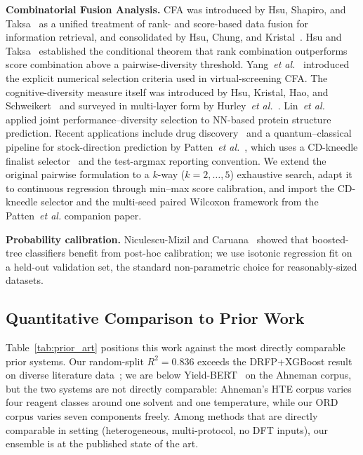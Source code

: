 \documentclass[conference]{IEEEtran}
\begin{document}
\noindent\textbf{Combinatorial Fusion Analysis.}
CFA was introduced by Hsu, Shapiro, and
Taksa~\cite{Hsu2002DIMACS} as a unified treatment of rank- and score-based
data fusion for information retrieval, and consolidated by Hsu, Chung, and
Kristal~\cite{Hsu2008}. Hsu and Taksa~\cite{Hsu2005Fusion} established
the conditional theorem that rank combination outperforms score combination
above a pairwise-diversity threshold. Yang~\textit{et
al.}~\cite{Yang2005Consensus} introduced the explicit numerical selection
criteria used in virtual-screening CFA. The cognitive-diversity measure
itself was introduced by Hsu, Kristal, Hao, and
Schweikert~\cite{Hsu2019CD} and surveyed in multi-layer form by
Hurley~\textit{et al.}~\cite{Hurley2021}. Lin~\textit{et al.}~\cite{Lin2007}
applied joint performance--diversity selection to NN-based protein
structure prediction. Recent applications include drug
discovery~\cite{Jiang2023ADMET} and a quantum--classical pipeline for
stock-direction prediction by Patten~\textit{et
al.}~\cite{Patten2026Quantum}, which uses a CD-kneedle finalist
selector~\cite{Satopaa2011Knee} and the test-argmax reporting
convention. We extend the original pairwise formulation to a $k$-way
($k=2,\dots,5$) exhaustive search, adapt it to continuous regression
through min--max score calibration, and import the CD-kneedle selector
and the multi-seed paired Wilcoxon framework from the
Patten~\textit{et al.} companion paper.

\noindent\textbf{Probability calibration.}
Niculescu-Mizil and Caruana~\cite{Niculescu2005} showed that boosted-tree
classifiers benefit from post-hoc calibration; we use isotonic regression
fit on a held-out validation set, the standard non-parametric choice for
reasonably-sized datasets.

\subsection{Quantitative Comparison to Prior Work}
Table~\ref{tab:prior_art} positions this work against the most directly
comparable prior systems. Our random-split $R^{2}=0.836$ exceeds the
DRFP+XGBoost result on diverse literature data~\cite{Probst2022}; we are
below Yield-BERT~\cite{Schwaller2021YB} on the Ahneman corpus, but the
two systems are not directly comparable: Ahneman's HTE corpus varies four
reagent classes around one solvent and one temperature, while our ORD
corpus varies seven components freely. Among methods that are directly
comparable in setting (heterogeneous, multi-protocol, no DFT inputs), our
ensemble is at the published state of the art.
\end{document}
